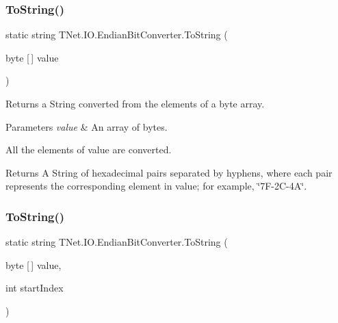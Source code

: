 \subsubsection{\texorpdfstring{To\+String()}{ToString()}\hspace{0.1cm}{\footnotesize\ttfamily [1/3]}}
{\footnotesize\ttfamily static string T\+Net.\+I\+O.\+Endian\+Bit\+Converter.\+To\+String (\begin{DoxyParamCaption}\item[{byte \mbox{[}$\,$\mbox{]}}]{value }\end{DoxyParamCaption})\hspace{0.3cm}{\ttfamily [static]}}



Returns a String converted from the elements of a byte array. 


\begin{DoxyParams}{Parameters}
{\em value} & An array of bytes.\\
\hline
\end{DoxyParams}


All the elements of value are converted.

\begin{DoxyReturn}{Returns}
A String of hexadecimal pairs separated by hyphens, where each pair represents the corresponding element in value; for example, \char`\"{}7\+F-\/2\+C-\/4\+A\char`\"{}. 
\end{DoxyReturn}
\mbox{\label{class_t_net_1_1_i_o_1_1_endian_bit_converter_a28aabc2bed261bbd287911df84512dcd}} 
\subsubsection{\texorpdfstring{To\+String()}{ToString()}\hspace{0.1cm}{\footnotesize\ttfamily [2/3]}}
{\footnotesize\ttfamily static string T\+Net.\+I\+O.\+Endian\+Bit\+Converter.\+To\+String (\begin{DoxyParamCaption}\item[{byte \mbox{[}$\,$\mbox{]}}]{value,  }\item[{int}]{start\+Index }\end{DoxyParamCaption})\hspace{0.3cm}{\ttfamily [static]}}



